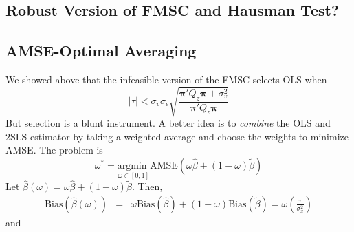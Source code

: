 \documentclass[12pt]{article}
\theoremstyle{definition}
\begin{document}
\subsection{Robust Version of FMSC and Hausman Test?} %
\label{sub:robust_version_of_fmsc_and_hausman_test_}





\subsection{AMSE-Optimal Averaging} %
\label{sub:amse_optimal_averaging}
We showed above that the infeasible version of the FMSC selects OLS when 
  $$|\tau|  < \sigma_v \sigma_\epsilon\sqrt{\frac{\boldsymbol{\pi}'Q_z \boldsymbol{\pi} + \sigma_v^2}{\boldsymbol{\pi}'Q_z \boldsymbol{\pi}}}$$
But selection is a blunt instrument. A better idea is to \emph{combine} the OLS and 2SLS estimator by taking a weighted average and choose the weights to minimize AMSE. The problem is 
  $$\omega^* = \underset{\omega \in [0,1]}{\mbox{argmin }} \mbox{AMSE}\left(\omega \widehat{\beta} + (1-\omega)\widetilde{\beta}\right)  $$
  Let $\widehat{\beta}(\omega) = \omega \widehat{\beta} + (1-\omega) \widetilde{\beta}$. Then,
    \begin{eqnarray*}
      \mbox{Bias}\left(\widehat{\beta}(\omega)\right) &=& \omega\mbox{Bias}(\widehat{\beta}) + (1-\omega)\mbox{Bias}(\widetilde{\beta})=\omega\left( \frac{\tau}{\sigma_x^2}\right)
    \end{eqnarray*}
  and
\end{document}
